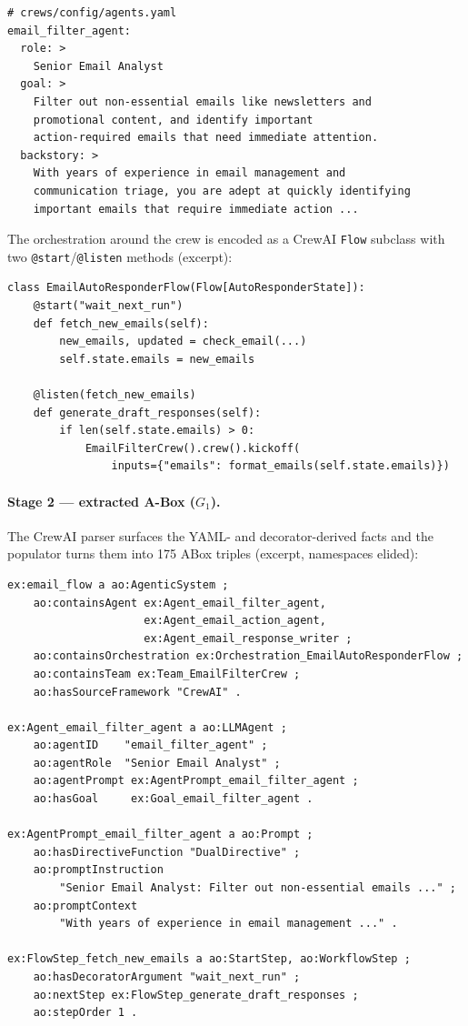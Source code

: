 \begin{verbatim}
# crews/config/agents.yaml
email_filter_agent:
  role: >
    Senior Email Analyst
  goal: >
    Filter out non-essential emails like newsletters and
    promotional content, and identify important
    action-required emails that need immediate attention.
  backstory: >
    With years of experience in email management and
    communication triage, you are adept at quickly identifying
    important emails that require immediate action ...
\end{verbatim}

The orchestration around the crew is encoded as a CrewAI
\texttt{Flow} subclass with two \texttt{@start}/\texttt{@listen}
methods (excerpt):

\begin{verbatim}
class EmailAutoResponderFlow(Flow[AutoResponderState]):
    @start("wait_next_run")
    def fetch_new_emails(self):
        new_emails, updated = check_email(...)
        self.state.emails = new_emails

    @listen(fetch_new_emails)
    def generate_draft_responses(self):
        if len(self.state.emails) > 0:
            EmailFilterCrew().crew().kickoff(
                inputs={"emails": format_emails(self.state.emails)})
\end{verbatim}

\paragraph{Stage 2 — extracted A-Box ($G_1$).}
The CrewAI parser surfaces the YAML- and decorator-derived facts and
the populator turns them into 175 ABox triples (excerpt, namespaces
elided):

\begin{verbatim}
ex:email_flow a ao:AgenticSystem ;
    ao:containsAgent ex:Agent_email_filter_agent,
                     ex:Agent_email_action_agent,
                     ex:Agent_email_response_writer ;
    ao:containsOrchestration ex:Orchestration_EmailAutoResponderFlow ;
    ao:containsTeam ex:Team_EmailFilterCrew ;
    ao:hasSourceFramework "CrewAI" .

ex:Agent_email_filter_agent a ao:LLMAgent ;
    ao:agentID    "email_filter_agent" ;
    ao:agentRole  "Senior Email Analyst" ;
    ao:agentPrompt ex:AgentPrompt_email_filter_agent ;
    ao:hasGoal     ex:Goal_email_filter_agent .

ex:AgentPrompt_email_filter_agent a ao:Prompt ;
    ao:hasDirectiveFunction "DualDirective" ;
    ao:promptInstruction
        "Senior Email Analyst: Filter out non-essential emails ..." ;
    ao:promptContext
        "With years of experience in email management ..." .

ex:FlowStep_fetch_new_emails a ao:StartStep, ao:WorkflowStep ;
    ao:hasDecoratorArgument "wait_next_run" ;
    ao:nextStep ex:FlowStep_generate_draft_responses ;
    ao:stepOrder 1 .
\end{verbatim}

